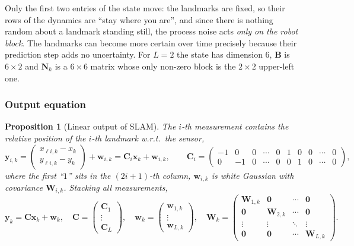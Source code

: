 \documentclass[11pt,a4paper]{article}
\theoremstyle{definition}
\theoremstyle{plain}
\newtheorem{proposition}[definition]{Proposition}
\theoremstyle{remark}
\begin{document}
\begin{intuition}
Only the first two entries of the state move: the landmarks are fixed, so their rows of the dynamics are ``stay where you are'', and since there is nothing random about a landmark standing still, the process noise acts \emph{only on the robot block}. The landmarks can become more certain over time precisely because their prediction step adds no uncertainty. For $L=2$ the state has dimension $6$, $\bm B$ is $6\times2$ and $\bm N_k$ is a $6\times6$ matrix whose only non-zero block is the $2\times2$ upper-left one.
\end{intuition}

\subsubsection*{Output equation}
\begin{proposition}[Linear output of SLAM]
\label{prop:slamout}
The $i$-th measurement contains the relative position of the $i$-th landmark w.r.t.\ the sensor,
\[
\bm y_{i,k}=\begin{pmatrix}x_{\ell i,k}-x_k\\y_{\ell i,k}-y_k\end{pmatrix}+\bm w_{i,k}=\bm C_i\bm x_k+\bm w_{i,k},\qquad
\bm C_i=\begin{pmatrix}-1&0&0&\cdots&0&1&0&0&\cdots&0\\0&-1&0&\cdots&0&0&1&0&\cdots&0\end{pmatrix},
\]
where the first ``$1$'' sits in the $(2i+1)$-th column, $\bm w_{i,k}$ is white Gaussian with covariance $\bm W_{i,k}$. Stacking all measurements,
\[
\bm y_k=\bm C\bm x_k+\bm w_k,\quad
\bm C=\begin{pmatrix}\bm C_1\\\vdots\\\bm C_L\end{pmatrix},\quad
\bm w_k=\begin{pmatrix}\bm w_{1,k}\\\vdots\\\bm w_{L,k}\end{pmatrix},\quad
\bm W_k=\begin{pmatrix}\bm W_{1,k}&\bm 0&\cdots&\bm 0\\\bm 0&\bm W_{2,k}&\cdots&\bm 0\\\vdots&\vdots&\ddots&\vdots\\\bm 0&\bm 0&\cdots&\bm W_{L,k}\end{pmatrix}.
\]
\end{proposition}
\end{document}
